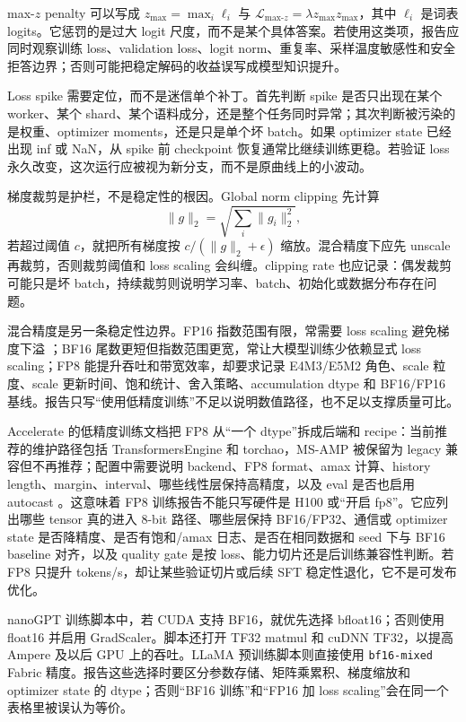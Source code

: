 \documentclass[UTF8,zihao=-4,openany]{ctexbook}
\begin{document}
max-$z$ penalty 可以写成 $z_{\max}=\max_i\ell_i$ 与 $\mathcal{L}_{\text{max-}z}=\lambda z_{\max}z_{\max}$，其中 $\ell_i$ 是词表 logits。它惩罚的是过大 logit 尺度，而不是某个具体答案。若使用这类项，报告应同时观察训练 loss、validation loss、logit norm、重复率、采样温度敏感性和安全拒答边界；否则可能把稳定解码的收益误写成模型知识提升。

Loss spike 需要定位，而不是迷信单个补丁。首先判断 spike 是否只出现在某个 worker、某个 shard、某个语料成分，还是整个任务同时异常；其次判断被污染的是权重、optimizer moments，还是只是单个坏 batch。如果 optimizer state 已经出现 inf 或 NaN，从 spike 前 checkpoint 恢复通常比继续训练更稳。若验证 loss 永久改变，这次运行应被视为新分支，而不是原曲线上的小波动。

梯度裁剪是护栏，不是稳定性的根因。Global norm clipping 先计算
\[
  \|g\|_2=\sqrt{\sum_i\|g_i\|_2^2},
\]
若超过阈值 $c$，就把所有梯度按 $c/(\|g\|_2+\epsilon)$ 缩放。混合精度下应先 unscale 再裁剪，否则裁剪阈值和 loss scaling 会纠缠。clipping rate 也应记录：偶发裁剪可能只是坏 batch，持续裁剪则说明学习率、batch、初始化或数据分布存在问题。

混合精度是另一条稳定性边界。FP16 指数范围有限，常需要 loss scaling 避免梯度下溢 \cite{micikevicius2017mixed}；BF16 尾数更短但指数范围更宽，常让大模型训练少依赖显式 loss scaling；FP8 能提升吞吐和带宽效率，却要求记录 E4M3/E5M2 角色、scale 粒度、scale 更新时间、饱和统计、舍入策略、accumulation dtype 和 BF16/FP16 基线。报告只写“使用低精度训练”不足以说明数值路径，也不足以支撑质量可比。

Accelerate 的低精度训练文档把 FP8 从“一个 dtype”拆成后端和 recipe：当前推荐的维护路径包括 TransformersEngine 和 torchao，MS-AMP 被保留为 legacy 兼容但不再推荐；配置中需要说明 backend、FP8 format、amax 计算、history length、margin、interval、哪些线性层保持高精度，以及 eval 是否也启用 autocast \cite{huggingface2026acceleratefp8}。这意味着 FP8 训练报告不能只写硬件是 H100 或“开启 fp8”。它应列出哪些 tensor 真的进入 8-bit 路径、哪些层保持 BF16/FP32、通信或 optimizer state 是否降精度、是否有饱和/amax 日志、是否在相同数据和 seed 下与 BF16 baseline 对齐，以及 quality gate 是按 loss、能力切片还是后训练兼容性判断。若 FP8 只提升 tokens/s，却让某些验证切片或后续 SFT 稳定性退化，它不是可发布优化。

nanoGPT 训练脚本中，若 CUDA 支持 BF16，就优先选择 bfloat16；否则使用 float16 并启用 GradScaler。脚本还打开 TF32 matmul 和 cuDNN TF32，以提高 Ampere 及以后 GPU 上的吞吐。LLaMA 预训练脚本则直接使用 \texttt{bf16-mixed} Fabric 精度。报告这些选择时要区分参数存储、矩阵乘累积、梯度缩放和 optimizer state 的 dtype；否则“BF16 训练”和“FP16 加 loss scaling”会在同一个表格里被误认为等价。
\end{document}
